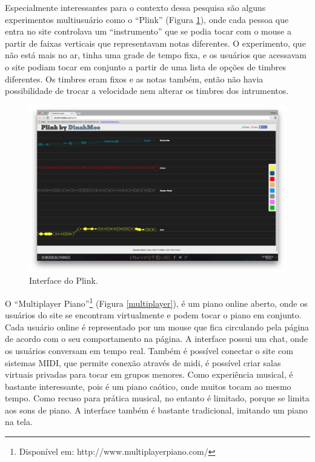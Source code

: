 Especialmente interessantes para o contexto dessa pesquisa são alguns experimentos multiusuário como o ``Plink'' (Figura \ref{plink}), onde cada pessoa que entra no site controlava um ``instrumento'' que se podia tocar com o mouse a partir de faixas verticais que representavam notas diferentes. O experimento, que não está mais no ar, tinha uma grade de tempo fixa, e os usuários que acessavam o site podiam tocar em conjunto a partir de uma lista de opções de timbres diferentes. Os timbres eram fixos e as notas também, então não havia possibilidade de trocar a velocidade nem alterar os timbres dos intrumentos. 

\begin{figure}[ht]
    \caption{\label{plink}Interface do Plink.}
    \begin{center}
        \includegraphics[width=1\linewidth]{pictures/cap2/plink}
    \end{center}
\end{figure}

O ``Multiplayer Piano''\footnote{Disponível em: http://www.multiplayerpiano.com/} (Figura \ref{multiplayer}), é um piano online aberto, onde os usuários do site se encontram virtualmente e podem tocar o piano em conjunto. Cada usuário online é representado por um mouse que fica circulando pela página de acordo com o seu comportamento na página. A interface possui um chat, onde os usuários conversam em tempo real. Também é possível conectar o site com sistemas MIDI, que permite conexão através de midi, é possível criar salas virtuais privadas para tocar em grupos menores. Como experiência musical, é bastante interessante, pois é um piano caótico, onde muitos tocam ao mesmo tempo. Como recuso para prática musical, no entanto é limitado, porque se limita aos sons de piano. A interface também é bastante tradicional, imitando um piano na tela.


